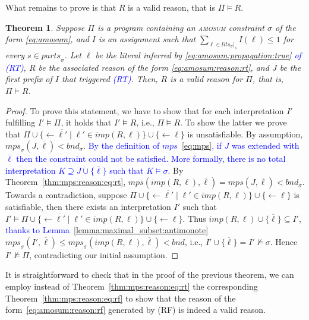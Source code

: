 \documentclass[preprint,authoryear]{elsarticle}
\newcommand{\mps}{\mathit{mps}}
\newcommand{\bnd}{\mathit{bnd}}
\newtheorem{theorem}{Theorem}[section]
\theoremstyle{definition}
\begin{document}
What remains to prove is that $R$ is a valid reason, that is $\Pi \models R$.
\begin{theorem}
 Suppose $\Pi$ is a program containing an \textsc{amosum} constraint $\sigma$ of the form \eqref{eq:amosum}, and $I$ is an assignment such that $\sum_{\ell \in \mathit{lits}_\sigma|_s}{I(\ell)} \leq 1$ for every $s \in \mathit{parts}_{\sigma} $. Let $\ell$ be the literal inferred by \textcolor{blue}{\eqref{eq:amosum:propagation:true} of (RT)}, $R$ be the associated reason  of the form \textcolor{blue}{\eqref{eq:amosum:reason:rt}},  and $J$ be the first prefix of $I$ that triggered \textcolor{blue}{(RT)}. Then, $R$ is a valid reason for $\Pi$, that is, $\Pi \models R$.
\end{theorem}
\begin{proof}
    To prove this statement, we have to show that for each interpretation $I'$ fulfilling $I' \models \Pi$, it holds that $I' \models R$, i.e., $\Pi \models R$.
    To show the latter we prove that $\Pi \cup \{\leftarrow \overline{\ell'} \mid \ell' \in \mathit{imp}(R,\ell)\} \cup \{\leftarrow \ell \}$ is unsatisfiable.
    By assumption, $\mps_\sigma(J,\overline{\ell}) < \bnd_\sigma$. \textcolor{blue}{By the definition of $\mps$~\eqref{eq:mps}, if $J$ was extended with $\overline{\ell}$ then the constraint could not be satisfied. 
    More formally, there is no total interpretation $K \supseteq J \mathbin{\dot\cup} \{\overline{\ell}\}$ such that $K \models \sigma$.}
    By Theorem~\ref{thm:mps:reason:eq:rt}, $\mps(\mathit{imp}(R,\ell),\overline{\ell}) = \mps(J,\overline{\ell}) < \bnd_\sigma.$
    Towards a contradiction, suppose $\Pi \cup \{\leftarrow \overline{\ell'} \mid \ell' \in \mathit{imp}(R,\ell)\} \cup \{\leftarrow \ell \}$ is satisfiable, then there exists an interpretation $I'$ such that $I' \models \Pi \cup \{\leftarrow \overline{\ell'} \mid \ell' \in \mathit{imp}(R,\ell)\} \cup \{\leftarrow \ell \}$. Thus $\mathit{imp}(R,\ell) \cup \{\overline{\ell}\} \subseteq I'$, \textcolor{blue}{thanks to Lemma~\ref{lemma:maximal_subset:antimonote}} $\mps_\sigma(I',\overline{\ell}) \le \mps_\sigma(\mathit{imp}(R,\ell),\overline{\ell}) < \bnd$, i.e., $I' \cup \{\overline{\ell}\}= I' \not\models \sigma$.
    Hence $I' \not\models \Pi$, contradicting our initial assumption.
\end{proof}

It is straightforward to check that in the proof of the previous theorem, we can employ instead of Theorem~\ref{thm:mps:reason:eq:rt} the corresponding Theorem~\ref{thm:mps:reason:eq:rf} to show that the reason of the form~\eqref{eq:amosum:reason:rf} generated by (RF) is indeed a valid reason. 
\end{document}
